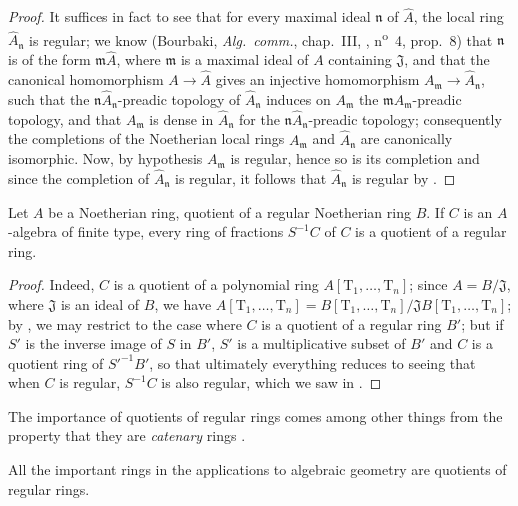 \begin{proof}
It suffices in fact  to see that for every maximal ideal $\mathfrak{n}$ of $\widehat{A}$, the local ring $\widehat{A}_\mathfrak{n}$ is regular;
we know (Bourbaki, \emph{Alg.~comm.}, chap.~III, , n\textsuperscript{o}~4, prop.~8) that $\mathfrak{n}$ is of the form $\mathfrak{m}\widehat{A}$, where $\mathfrak{m}$ is a maximal ideal of $A$ containing $\mathfrak{J}$, and that the canonical homomorphism $A\to\widehat{A}$ gives an injective homomorphism $A_\mathfrak{m}\to\widehat{A}_\mathfrak{n}$, such that the $\mathfrak{n}\widehat{A}_\mathfrak{n}$-preadic topology of $\widehat{A}_\mathfrak{n}$ induces on $A_\mathfrak{m}$ the $\mathfrak{m}A_\mathfrak{m}$-preadic topology, and that $A_\mathfrak{m}$ is dense in $\widehat{A}_\mathfrak{n}$ for the $\mathfrak{n}\widehat{A}_\mathfrak{n}$-preadic topology;
consequently the completions of the Noetherian local rings $A_\mathfrak{m}$ and $\widehat{A}_\mathfrak{n}$ are canonically isomorphic.
Now, by hypothesis $A_\mathfrak{m}$ is regular, hence so is its completion  and since the completion of $\widehat{A}_\mathfrak{n}$ is regular, it follows that $\widehat{A}_\mathfrak{n}$ is regular by .
\end{proof}

\begin{corollary}[17.3.9]
\label{0.17.3.9}
Let $A$ be a Noetherian ring, quotient of a regular Noetherian ring $B$.
If $C$ is an $A$-algebra of finite type, every ring of fractions $S^{-1}C$ of $C$ is a quotient of a regular ring.
\end{corollary}

\begin{proof}
Indeed, $C$ is a quotient of a polynomial ring $A[\mathrm{T}_1,\ldots,\mathrm{T}_n]$;
since $A=B/\mathfrak{J}$, where $\mathfrak{J}$ is an ideal of $B$, we have $A[\mathrm{T}_1,\ldots,\mathrm{T}_n]=B[\mathrm{T}_1,\ldots,\mathrm{T}_n]/\mathfrak{J}B[\mathrm{T}_1,\ldots,\mathrm{T}_n]$;
by , we may restrict to the case where $C$ is a quotient of a regular ring $B'$;
but if $S'$ is the inverse image of $S$ in $B'$, $S'$ is a multiplicative subset of $B'$ and $C$ is a quotient ring of $S'^{-1}B'$, so that ultimately everything reduces to seeing that when $C$ is regular, $S^{-1}C$ is also regular, which we saw in .
\end{proof}

The importance of quotients of regular rings comes among other things from the property that they are \emph{catenary} rings .

All the important rings in the applications to algebraic geometry are quotients of regular rings.
